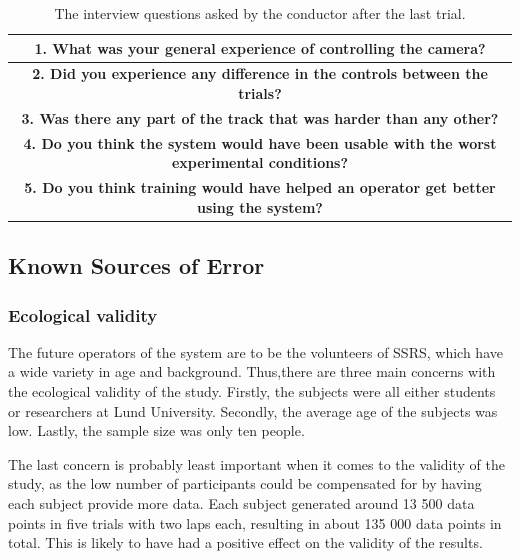 \documentclass[nofilelist]{cslthse-msc}
\begin{document}
\setlength{\extrarowheight}{5pt}
\vspace{10pt}

\begin{table}[!hbt]
   \centering
      \begin{tabular}{|c|}
         \hline
         \textbf{1. What was your general experience of controlling the camera?} \\
         \hline
         \textbf{2. Did you experience any difference in the controls between the trials?} \\
         \hline
         \textbf{3. Was there any part of the track that was harder than any other?} \\
         \hline
         \textbf{4. Do you think the system would have been usable with the worst experimental conditions?} \\
         \hline
         \textbf{5. Do you think training would have helped an operator get better using the system?} \\
         \hline
      \end{tabular}
   \caption{The interview questions asked by the conductor after the last trial.}
   \label{tab:interview-questions}
\end{table}

\vspace{10pt}


\subsection{Known Sources of Error}

\subsubsection{Ecological validity}
The future operators of the system are to be the volunteers of SSRS, which have a wide variety in age and background. Thus,there are three main concerns with the ecological validity of the study. Firstly, the subjects were all either students or researchers at Lund University. Secondly, the average age of the subjects was low. Lastly, the sample size was only ten people. 

The last concern is probably least important when it comes to the validity of the study, as the low number of participants could be compensated for by having each subject provide more data. Each subject generated around 13 500 data points in five trials with two laps each, resulting in about 135 000 data points in total. This is likely to have had a positive effect on the validity of the results.
\end{document}
